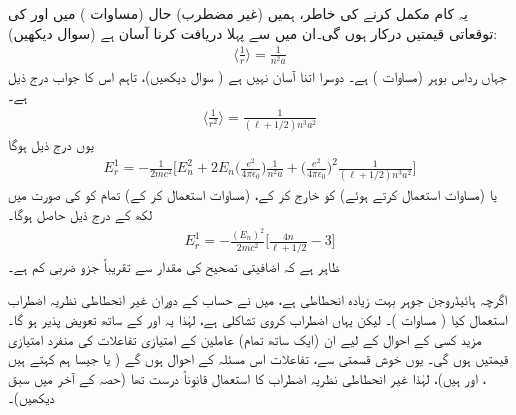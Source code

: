  یہ کام مکمل کرنے کی خاطر، ہمیں (غیر مضطرب) حال  (مساوات ) میں  اور  کی توقعاتی قیمتیں درکار ہوں گی۔ان میں سے پہلا دریافت کرنا آسان ہے (سوال  دیکھیں):
\begin{align}\label{مساوات_غیر_مضطرب_آر_ایک}
\big\langle \frac{1}{r} \big\rangle = \frac{1}{n^2 a}
\end{align}
جہاں  رداس بوہر (مساوات ) ہے۔ دوسرا اتنا آسان نہیں ہے ( سوال  دیکھیں)، تاہم اس کا جواب درج ذیل ہے۔
\begin{align}\label{مساوات_غیر_مضطرب_آر_دوم}
\big\langle \frac{1}{r^2} \big\rangle = \frac{1}{(\ell + 1/2)n^3 a^2}
\end{align}
یوں درج ذیل ہوگا 
\begin{align*}
E_r^1 = - \frac{1}{2mc^2} \big [ E_n^2 + 2 E_n \big(\frac{e^2}{4 \pi \epsilon_0}\big) \frac{1}{n^2 a} + \big(\frac{e^2}{4 \pi \epsilon_0}\big)^2 \frac{1}{(\ell + 1/2)n^3 a^2} \big ]
\end{align*}
یا (مساوات  استعمال کرتے ہوئے)  کو خارج کر کے، (مساوات  استعمال کر کے) تمام کو  کی صورت میں لکھ کے درج ذیل حاصل ہوگا۔
\begin{align}\label{مساوات_غیر_مضطرب_اضافیتی_تصحیح}
E_r^1 = - \frac{(E_n)^2}{2mc^2} \big [ \frac{4n}{\ell + 1/2} - 3 \big ]
\end{align}
ظاہر ہے کہ اضافیتی تصحیح کی مقدار  سے تقریباً جزو ضربی کم ہے۔

اگرچہ ہائیڈروجن جوہر بہت زیادہ انحطاطی ہے، میں نے حساب کے دوران غیر انحطاطی نظریہ اضطراب استعمال کیا ( مساوات )۔ لیکن یہاں اضطراب کروی تشاکلی ہے، لہٰذا یہ  اور  کے ساتھ تعویض پذیر  ہو گا۔ مزید کسی  کے  احوال کے لیے ان (ایک ساتھ تمام) عاملین کے امتیازی تفاعلات کی منفرد امتیازی  قیمتیں  ہوں گی۔ یوں خوش قسمتی سے، تفاعلات  اس مسئلہ کے احوال ہوں گے ( یا جیسا ہم کہتے ہیں ،  اور   ہیں)، لہٰذا غیر انحطاطی نظریہ اضطراب کا استعمال قانوناً درست تھا (حصہ  کے آخر میں سبق دیکھیں)۔


